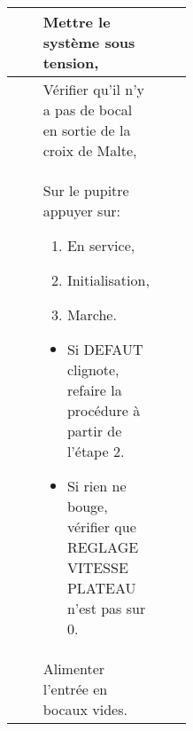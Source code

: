 \newcommand{\image}{Capsuleuse}
\newcommand{\nomsysteme}{Capsuleuse}
\newcommand{\nomtitre}{de la capsuleuse}





\begin{tabular}{|Ep{0.4\linewidth}|p{.5\linewidth}|}
\hline
& Mettre le système sous tension,
&\tabularnewline\hline
 & Vérifier qu'il n'y a pas de bocal en sortie de la croix de Malte,
&\tabularnewline\hline
& Sur le pupitre appuyer sur:
\begin{enumerate}
 \item En service,
 \item Initialisation,
 \item Marche.
\end{enumerate}
\begin{itemize}
 \item Si DEFAUT clignote, refaire la procédure à partir de l'étape 2.
 \item Si rien ne bouge, vérifier que REGLAGE VITESSE PLATEAU n'est pas sur 0.
\end{itemize}
&\tabularnewline\hline
& Alimenter l'entrée en bocaux vides.
&\tabularnewline\hline
\end{tabular}



